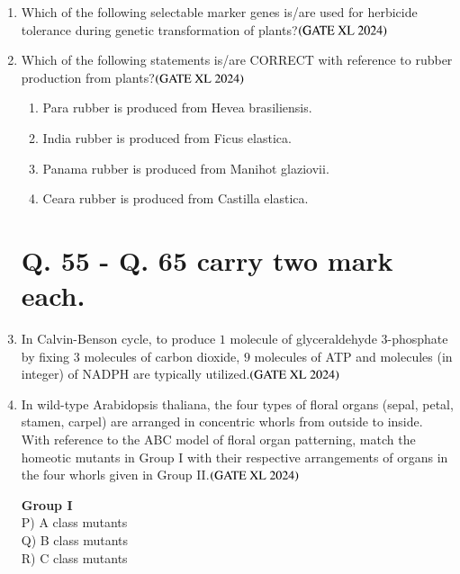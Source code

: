 \documentclass[journal]{IEEEtran}
\begin{document}
\begin{enumerate}
    \item Which of the following selectable marker genes is/are used for herbicide tolerance during genetic transformation of plants?\hfill $\left(\text{GATE XL 2024}\right)$
    \begin{enumerate}
    \end{enumerate}

    \item Which of the following statements is/are CORRECT with reference to rubber production from plants?\hfill $\left(\text{GATE XL 2024}\right)$
    \begin{enumerate}
        \item Para rubber is produced from Hevea brasiliensis.
        \item India rubber is produced from Ficus elastica.
        \item Panama rubber is produced from Manihot glaziovii.
        \item Ceara rubber is produced from Castilla elastica.
    \end{enumerate}

\section*{Q. 55 - Q. 65 carry two mark each.} 
    \item In Calvin-Benson cycle, to produce $1$ molecule of glyceraldehyde 3-phosphate by fixing $3$ molecules of carbon dioxide, $9$ molecules of ATP and molecules (in integer) of NADPH are typically utilized.\hfill $\left(\text{GATE XL 2024}\right)$

    \item In wild-type Arabidopsis thaliana, the four types of floral organs (sepal, petal, stamen, carpel) are arranged in concentric whorls from outside to inside. With reference to the ABC model of floral organ patterning, match the homeotic mutants in Group I with their respective arrangements of organs in the four whorls given in Group II.\hfill $\left(\text{GATE XL 2024}\right)$
    \begin{multicols}{2}
    \noindent \textbf{Group I} \\
    P) A class mutants \\
    Q) B class mutants \\
    R) C class mutants \\


\end{multicols}
\end{enumerate}
\end{document}
